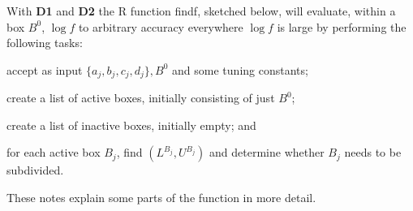 \documentclass{report}
\newcommand{\textcompute}{\textsf}
\newcommand{\RL}{f}
\newcommand{\logRL}{\log\RL}
\begin{document}
With \textbf{D1} and \textbf{D2} the \textcompute{R} function \textcompute{findf}, sketched below, will evaluate, within a box $B^0$, $\logRL$ to arbitrary accuracy everywhere $\logRL$ is large by performing the following tasks:
\begin{enumerate*}[label=(\alph*)]
\item accept as input $\{a_j, b_j, c_j, d_j\}, B^0$ and some tuning constants;
\item create a list of active boxes, initially consisting of just $B^0$;
\item create a list of inactive boxes, initially empty; and
\item for each active box $B_j$, find $(L^{B_j}, U^{B_j})$ and determine whether $B_j$ needs to be subdivided.
\end{enumerate*}
 These notes explain some parts of the function in more detail.
\end{document}
